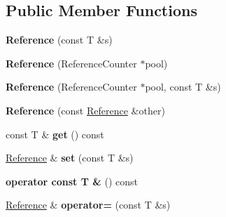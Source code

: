 \subsection*{Public Member Functions}
\begin{DoxyCompactItemize}
\item 
{\bfseries Reference} (const T \&s)\hypertarget{classSharedPool_1_1Reference_ad214f797d8e6a2fae1c6d1061897d01b}{}\label{classSharedPool_1_1Reference_ad214f797d8e6a2fae1c6d1061897d01b}

\item 
{\bfseries Reference} (Reference\+Counter $\ast$pool)\hypertarget{classSharedPool_1_1Reference_a9bdc1d0b336aa22010f1a25a98db68d5}{}\label{classSharedPool_1_1Reference_a9bdc1d0b336aa22010f1a25a98db68d5}

\item 
{\bfseries Reference} (Reference\+Counter $\ast$pool, const T \&s)\hypertarget{classSharedPool_1_1Reference_ad5a2e76d4df31516337b84488cc5c75b}{}\label{classSharedPool_1_1Reference_ad5a2e76d4df31516337b84488cc5c75b}

\item 
{\bfseries Reference} (const \hyperlink{classSharedPool_1_1Reference}{Reference} \&other)\hypertarget{classSharedPool_1_1Reference_a7752d4d9e32ea6bfe4d089981c2c9cef}{}\label{classSharedPool_1_1Reference_a7752d4d9e32ea6bfe4d089981c2c9cef}

\item 
const T \& {\bfseries get} () const \hypertarget{classSharedPool_1_1Reference_abe6e585173560d66699e76d4ad3058b8}{}\label{classSharedPool_1_1Reference_abe6e585173560d66699e76d4ad3058b8}

\item 
\hyperlink{classSharedPool_1_1Reference}{Reference} \& {\bfseries set} (const T \&s)\hypertarget{classSharedPool_1_1Reference_a5d1f3fae1f488eb61cd9376b027f0799}{}\label{classSharedPool_1_1Reference_a5d1f3fae1f488eb61cd9376b027f0799}

\item 
{\bfseries operator const T \&} () const \hypertarget{classSharedPool_1_1Reference_a7ca037687d8aa54e511155cf9cc92c2f}{}\label{classSharedPool_1_1Reference_a7ca037687d8aa54e511155cf9cc92c2f}

\item 
\hyperlink{classSharedPool_1_1Reference}{Reference} \& {\bfseries operator=} (const T \&s)\hypertarget{classSharedPool_1_1Reference_aebe5c2e55be0454bb4973bc6cc584eec}{}\label{classSharedPool_1_1Reference_aebe5c2e55be0454bb4973bc6cc584eec}


\end{DoxyCompactItemize}
